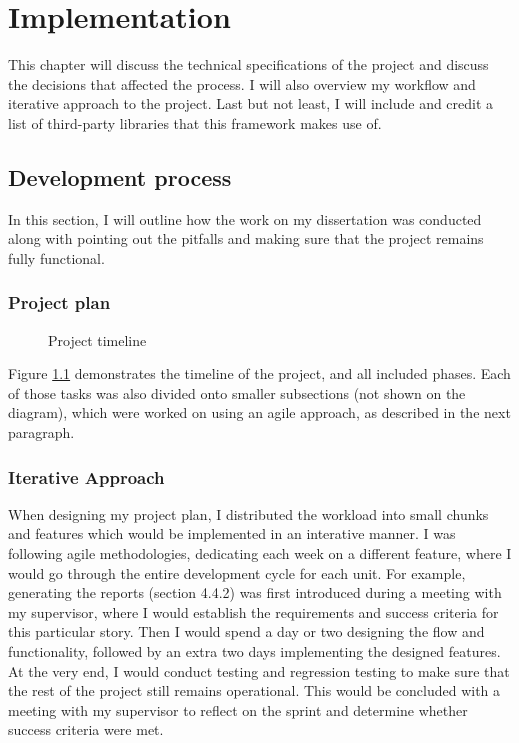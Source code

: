 \chapter{Implementation\label{chap:implementation}}
This chapter will discuss the technical specifications of the project and discuss the decisions that affected the process. I will also overview my workflow and iterative approach to the project. Last but not least, I will include and credit a list of third-party libraries that this framework makes use of.

\section{Development process}

In this section, I will outline how the work on my dissertation was conducted along with pointing out the pitfalls and making sure that the project remains fully functional.

\subsection{Project plan}

\begin{figure}[h]
    \centering
    \caption{Project timeline}
    \label{fig:timeline}
\end{figure}

Figure \ref{fig:timeline} demonstrates the timeline of the project, and all included phases. Each of those tasks was also divided onto smaller subsections (not shown on the diagram), which were worked on using an agile approach, as described in the next paragraph.

\subsection{Iterative Approach}

When designing my project plan, I distributed the workload into small chunks and features which would be implemented in an interative manner. I was following agile methodologies, dedicating each week on a different feature, where I would go through the entire development cycle for each unit. For example, generating the reports (section 4.4.2) was first introduced during a meeting with my supervisor, where I would establish the requirements and success criteria for this particular story. Then I would spend a day or two designing the flow and functionality, followed by an extra two days implementing the designed features. At the very end, I would conduct testing and regression testing to make sure that the rest of the project still remains operational. This would be concluded with a meeting with my supervisor to reflect on the sprint and determine whether success criteria were met.

